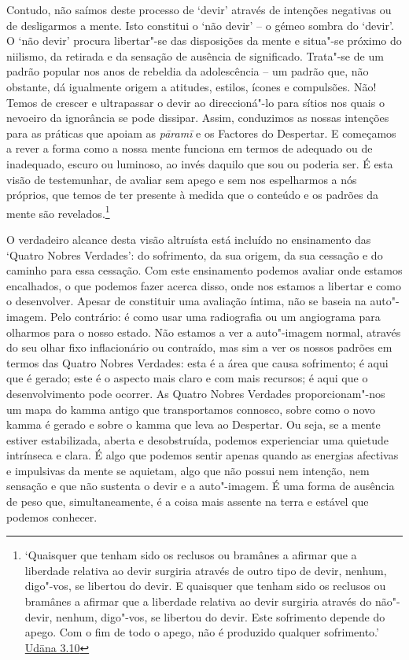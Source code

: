 Contudo, não saímos deste processo de `devir' através de intenções negativas ou de desligarmos a mente. Isto constitui o `não devir' -- o gémeo sombra do `devir'. O `não devir' procura libertar"-se das disposições da mente e situa"-se próximo do niilismo, da retirada e da sensação de ausência de significado. Trata"-se de um padrão popular nos anos de rebeldia da adolescência -- um padrão que, não obstante, dá igualmente origem a atitudes, estilos, ícones e compulsões. Não! Temos de crescer e ultrapassar o devir ao direccioná"-lo para sítios nos quais o nevoeiro da ignorância se pode dissipar. Assim, conduzimos as nossas intenções para as práticas que apoiam as \emph{pāramī} e os Factores do Despertar. E começamos a rever a forma como a nossa mente funciona em termos de adequado ou de inadequado, escuro ou luminoso, ao invés daquilo que sou ou poderia ser. É esta visão de testemunhar, de avaliar sem apego e sem nos espelharmos a nós próprios, que temos de ter presente à medida que o conteúdo e os padrões da mente são revelados.\footnote{`Quaisquer que tenham sido os reclusos ou bramânes a afirmar que a liberdade relativa ao devir surgiria através de outro tipo de devir, nenhum, digo"-vos, se libertou do devir. E quaisquer que tenham sido os reclusos ou bramânes a afirmar que a liberdade relativa ao devir surgiria através do não"-devir, nenhum, digo"-vos, se libertou do devir. Este sofrimento depende do apego. Com o fim de todo o apego, não é produzido qualquer sofrimento.' \href{https://suttacentral.net/ud3.10}{Udāna 3.10}}

O verdadeiro alcance desta visão altruísta está incluído no ensinamento das `Quatro Nobres Verdades': do sofrimento, da sua origem, da sua cessação e do caminho para essa cessação. Com este ensinamento podemos avaliar onde estamos encalhados, o que podemos fazer acerca disso, onde nos estamos a libertar e como o desenvolver. Apesar de constituir uma avaliação íntima, não se baseia na auto"-imagem. Pelo contrário: é como usar uma radiografia ou um angiograma para olharmos para o nosso estado. Não estamos a ver a auto"-imagem normal, através do seu olhar fixo inflacionário ou contraído, mas sim a ver os nossos padrões em termos das Quatro Nobres Verdades: esta é a área que causa sofrimento; é aqui que é gerado; este é o aspecto mais claro e com mais recursos; é aqui que o desenvolvimento pode ocorrer. As Quatro Nobres Verdades proporcionam"-nos um mapa do kamma antigo que transportamos connosco, sobre como o novo kamma é gerado e sobre o kamma que leva ao Despertar. Ou seja, se a mente estiver estabilizada, aberta e desobstruída, podemos experienciar uma quietude intrínseca e clara. É algo que podemos sentir apenas quando as energias afectivas e impulsivas da mente se aquietam, algo que não possui nem intenção, nem sensação e que não sustenta o devir e a auto"-imagem. É uma forma de ausência de peso que, simultaneamente, é a coisa mais assente na terra e estável que podemos conhecer.

